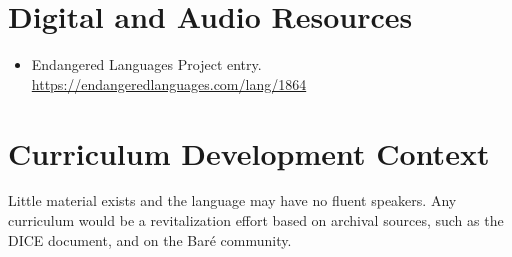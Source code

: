 \documentclass[12pt]{article}
\begin{document}
\section{Digital and Audio Resources}
\begin{itemize}
\item Endangered Languages Project entry. \url{https://endangeredlanguages.com/lang/1864}
\end{itemize}

\section{Curriculum Development Context}
Little material exists and the language may have no fluent speakers. Any curriculum would be a revitalization effort based on archival sources, such as the DICE document, and on the Bar\'e community.
\end{document}
